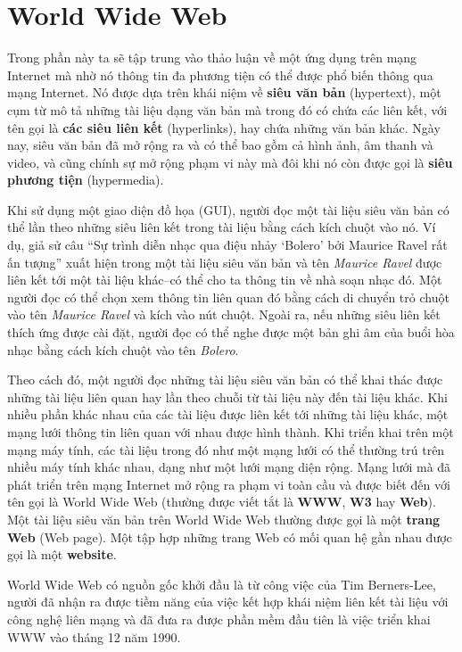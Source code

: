 
\section{World Wide Web}

Trong phần này ta sẽ tập trung vào thảo luận về một ứng dụng trên mạng Internet mà
nhờ nó thông tin đa phương tiện có thể được phổ biến thông qua mạng Internet. Nó được dựa
trên khái niệm về \textbf{siêu văn bản} (hypertext), một cụm từ mô tả những tài liệu dạng
văn bản mà trong đó có chứa các liên kết, với tên gọi là \textbf{các siêu liên kết}
(hyperlinks), hay chứa những văn bản khác. Ngày nay, siêu văn bản đã mở rộng ra và có thể
bao gồm cả hình ảnh, âm thanh và video, và cũng chính sự mở rộng phạm vi này mà đôi khi nó
còn được gọi là \textbf{siêu phương tiện} (hypermedia).

Khi sử dụng một giao diện đồ họa (GUI), người đọc một tài liệu siêu văn bản có thể lần
theo những siêu liên kết trong tài liệu bằng cách kích chuột vào nó. Ví dụ, giả sử câu
``Sự trình diễn nhạc qua điệu nhảy ‘Bolero’ bởi Maurice Ravel rất ấn tượng'' xuất hiện
trong một tài liệu siêu văn bản và tên \textit{Maurice Ravel} được liên kết tới một tài
liệu khác--có thể cho ta thông tin về nhà soạn nhạc đó. Một người đọc có thể chọn xem
thông tin liên quan đó bằng cách di chuyển trỏ chuột vào tên \textit{Maurice Ravel} và
kích vào nút chuột. Ngoài ra, nếu những siêu liên kết thích ứng được cài đặt, người đọc có
thể nghe được một bản ghi âm của buổi hòa nhạc bằng cách kích chuột vào tên
\textit{Bolero}.

Theo cách đó, một người đọc những tài liệu siêu văn bản có thể khai thác được những tài
liệu liên quan hay lần theo chuỗi từ tài liệu này đến tài liệu khác. Khi nhiều phần khác
nhau của các tài liệu được liên kết tới những tài liệu khác, một mạng lưới thông tin liên
quan với nhau được hình thành. Khi triển khai trên một mạng máy tính, các tài liệu trong
đó như một mạng lưới có thể thường trú trên nhiều máy tính khác nhau, dạng như một lưới
mạng diện rộng. Mạng lưới mà đã phát triển trên mạng Internet mở rộng ra phạm vi toàn cầu
và được biết đến với tên gọi là World Wide Web (thường được viết tắt là \textbf{WWW},
\textbf{W3} hay \textbf{Web}). Một tài liệu siêu văn bản trên World Wide Web thường được
gọi là một \textbf{trang Web} (Web page). Một tập hợp những trang Web có mối quan hệ gần
nhau được gọi là một \textbf{website}.

World Wide Web có nguồn gốc khởi đầu là từ công việc của Tim Berners-Lee, người đã nhận ra
được tiềm năng của việc kết hợp khái niệm liên kết tài liệu với công nghệ liên mạng và đã
đưa ra được phần mềm đầu tiên là việc triển khai WWW vào tháng 12 năm 1990.

